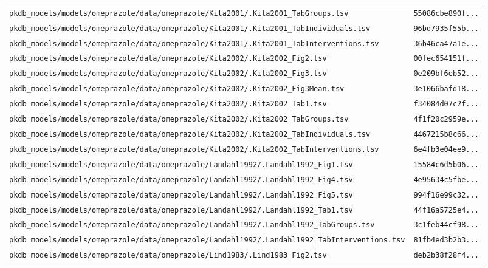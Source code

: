 \documentclass{article}
\begin{document}
\begin{longtable}{ll}
\texttt{pkdb\_models/models/omeprazole/data/omeprazole/Kita2001/.Kita2001\_TabGroups.tsv} & \texttt{55086cbe890f...} \\
\texttt{pkdb\_models/models/omeprazole/data/omeprazole/Kita2001/.Kita2001\_TabIndividuals.tsv} & \texttt{96bd7935f55b...} \\
\texttt{pkdb\_models/models/omeprazole/data/omeprazole/Kita2001/.Kita2001\_TabInterventions.tsv} & \texttt{36b46ca47a1e...} \\
\texttt{pkdb\_models/models/omeprazole/data/omeprazole/Kita2002/.Kita2002\_Fig2.tsv} & \texttt{00fec654151f...} \\
\texttt{pkdb\_models/models/omeprazole/data/omeprazole/Kita2002/.Kita2002\_Fig3.tsv} & \texttt{0e209bf6eb52...} \\
\texttt{pkdb\_models/models/omeprazole/data/omeprazole/Kita2002/.Kita2002\_Fig3Mean.tsv} & \texttt{3e1066bafd18...} \\
\texttt{pkdb\_models/models/omeprazole/data/omeprazole/Kita2002/.Kita2002\_Tab1.tsv} & \texttt{f34084d07c2f...} \\
\texttt{pkdb\_models/models/omeprazole/data/omeprazole/Kita2002/.Kita2002\_TabGroups.tsv} & \texttt{4f1f20c2959e...} \\
\texttt{pkdb\_models/models/omeprazole/data/omeprazole/Kita2002/.Kita2002\_TabIndividuals.tsv} & \texttt{4467215b8c66...} \\
\texttt{pkdb\_models/models/omeprazole/data/omeprazole/Kita2002/.Kita2002\_TabInterventions.tsv} & \texttt{6e4fb3e04ee9...} \\
\texttt{pkdb\_models/models/omeprazole/data/omeprazole/Landahl1992/.Landahl1992\_Fig1.tsv} & \texttt{15584c6d5b06...} \\
\texttt{pkdb\_models/models/omeprazole/data/omeprazole/Landahl1992/.Landahl1992\_Fig4.tsv} & \texttt{4e95634c5fbe...} \\
\texttt{pkdb\_models/models/omeprazole/data/omeprazole/Landahl1992/.Landahl1992\_Fig5.tsv} & \texttt{994f16e99c32...} \\
\texttt{pkdb\_models/models/omeprazole/data/omeprazole/Landahl1992/.Landahl1992\_Tab1.tsv} & \texttt{44f16a5725e4...} \\
\texttt{pkdb\_models/models/omeprazole/data/omeprazole/Landahl1992/.Landahl1992\_TabGroups.tsv} & \texttt{3c1feb44cf98...} \\
\texttt{pkdb\_models/models/omeprazole/data/omeprazole/Landahl1992/.Landahl1992\_TabInterventions.tsv} & \texttt{81fb4ed3b2b3...} \\
\texttt{pkdb\_models/models/omeprazole/data/omeprazole/Lind1983/.Lind1983\_Fig2.tsv} & \texttt{deb2b38f28f4...} \\

\end{longtable}
\end{document}

